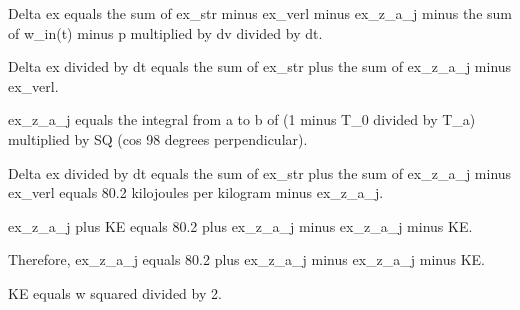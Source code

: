 Delta ex equals the sum of ex_str minus ex_verl minus ex_z_a_j minus the sum of w_in(t) minus p multiplied by dv divided by dt.  

Delta ex divided by dt equals the sum of ex_str plus the sum of ex_z_a_j minus ex_verl.  

ex_z_a_j equals the integral from a to b of (1 minus T_0 divided by T_a) multiplied by SQ (cos 98 degrees perpendicular).  

Delta ex divided by dt equals the sum of ex_str plus the sum of ex_z_a_j minus ex_verl equals 80.2 kilojoules per kilogram minus ex_z_a_j.  

ex_z_a_j plus KE equals 80.2 plus ex_z_a_j minus ex_z_a_j minus KE.  

Therefore, ex_z_a_j equals 80.2 plus ex_z_a_j minus ex_z_a_j minus KE.  

KE equals w squared divided by 2.